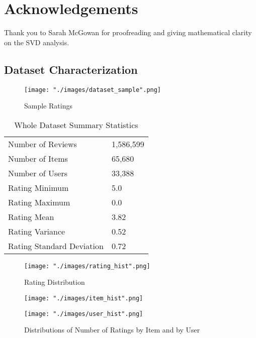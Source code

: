 \documentclass[12pt]{article}
\begin{document}
\section*{Acknowledgements}
Thank you to Sarah McGowan for proofreading and giving mathematical clarity on the SVD analysis.

\newpage
\begin{appendices}
\section*{Dataset Characterization}

    \begin{figure}[!ht]
    \begin{center}
    \caption{Sample Ratings}
        \texttt{[image: "./images/dataset\_sample".png]}
    \end{center}
    \end{figure}

    \begin{table}[ht!]
    \centering
    \caption{Whole Dataset Summary Statistics}
    \begin{tabular}{ll}
    \hline
    Number of Reviews         & 1,586,599 \\
    Number of Items           & 65,680    \\
    Number of Users           & 33,388    \\
    Rating Minimum            & 5.0       \\
    Rating Maximum            & 0.0       \\
    Rating Mean               & 3.82      \\
    Rating Variance           & 0.52      \\
    Rating Standard Deviation & 0.72      \\ \hline
    \end{tabular}
    \end{table}

    \begin{figure}[!ht]
    \begin{center}
    \caption{Rating Distribution}
        \texttt{[image: "./images/rating\_hist".png]}
    \end{center}
    \end{figure}

    \begin{figure}[!ht]
    \caption{Distributions of Number of Ratings by Item and by User}
    \centering
    \begin{minipage}{.5\textwidth}
      \centering
      \texttt{[image: "./images/item\_hist".png]}
    \end{minipage}%
    \begin{minipage}{.5\textwidth}
      \centering
      \texttt{[image: "./images/user\_hist".png]}
    \end{minipage}
    \end{figure}


\end{appendices}
\end{document}
